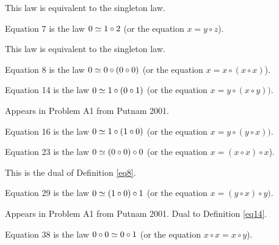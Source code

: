 This law is equivalent to the singleton law.

\begin{definition}[Equation 7]\label{eq7}\leanok{}  Equation 7 is the law $0 \simeq 1 \circ 2$ (or the equation $x = y \circ z$).
\end{definition}

This law is equivalent to the singleton law.

\begin{definition}[Equation 8]\label{eq8}\leanok{}  Equation 8 is the law $0 \simeq 0 \circ (0 \circ 0)$ (or the equation $x = x \circ (x \circ x)$).
\end{definition}

\begin{definition}[Equation 14]\label{eq14}\leanok{}  Equation 14 is the law $0 \simeq  1 \circ (0 \circ 1)$ (or the equation $x = y \circ (x \circ y))$.
\end{definition}

Appears in Problem A1 from Putnam 2001.

\begin{definition}[Equation 16]\label{eq16}\leanok{}  Equation 16 is the law $0 \simeq  1 \circ (1 \circ 0)$ (or the equation $x = y \circ (y \circ x))$.
\end{definition}

\begin{definition}[Equation 23]\label{eq23}\leanok{}  Equation 23 is the law $0 \simeq  (0 \circ 0) \circ 0$ (or the equation $x = (x \circ x) \circ x$).
\end{definition}

This is the dual of Definition \ref{eq8}.

\begin{definition}[Equation 29]\label{eq29}\leanok{}  Equation 29 is the law $0 \simeq  (1 \circ 0) \circ 1$ (or the equation $x = (y \circ x) \circ y)$.
\end{definition}

Appears in Problem A1 from Putnam 2001.  Dual to Definition \ref{eq14}.

\begin{definition}[Equation 38]\label{eq38}\leanok{}  Equation 38 is the law $0 \circ 0  \simeq  0 \circ 1$ (or the equation $x \circ x = x \circ y$).
\end{definition}

